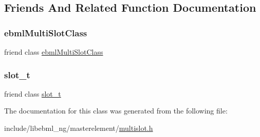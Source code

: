 \subsection{Friends And Related Function Documentation}
\mbox{\label{classebml_1_1ebmlMultiSlot_a229e8a019ffa3d8ab84c711635badcd1}} 
\subsubsection{\texorpdfstring{ebml\+Multi\+Slot\+Class}{ebmlMultiSlotClass}}
{\footnotesize\ttfamily friend class \mbox{\hyperlink{classebml_1_1ebmlMultiSlotClass}{ebml\+Multi\+Slot\+Class}}\hspace{0.3cm}{\ttfamily [friend]}}

\mbox{\label{classebml_1_1ebmlMultiSlot_a6546cbde3dc2846c329fd0ea73da851b}} 
\subsubsection{\texorpdfstring{slot\+\_\+t}{slot\_t}}
{\footnotesize\ttfamily friend class \mbox{\hyperlink{classebml_1_1slot__t}{slot\+\_\+t}}\hspace{0.3cm}{\ttfamily [friend]}}



The documentation for this class was generated from the following file\+:\begin{DoxyCompactItemize}
\item 
include/libebml\+\_\+ng/masterelement/\mbox{\hyperlink{multislot_8h}{multislot.\+h}}\end{DoxyCompactItemize}

